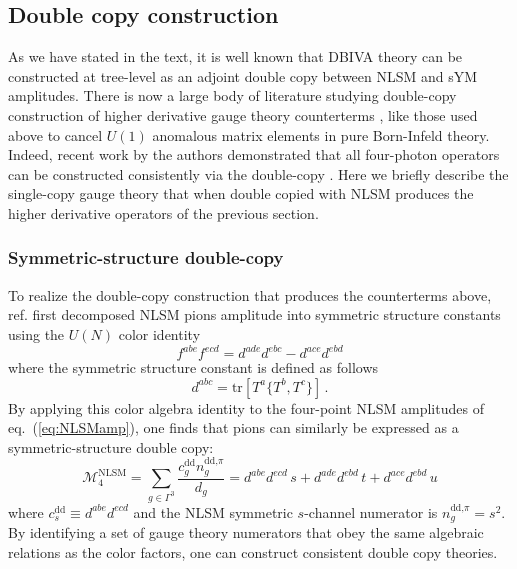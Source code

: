 \documentclass[11pt,letter]{article}
\def\eqn#1{eq.~(\ref{#1})}
\begin{document}
\subsection{Double copy construction}\label{sec:ActionDC}
As we have stated in the text, it is well known that DBIVA theory can be constructed at tree-level as an adjoint double copy between NLSM and sYM amplitudes. There is now a large body of literature studying double-copy construction of higher derivative gauge theory counterterms \cite{Carrasco:2019yyn,Carrasco:2021ptp,Chi:2021mio,Bonnefoy:2021qgu,Carrasco:2022lbm,Carrasco:2022sck,Pavao:2022kog,Chen:2022shl,Chen:2023dcx,Brown:2023srz}, like those used above to cancel $U(1)$ anomalous matrix elements in pure Born-Infeld theory. Indeed, recent work by the authors demonstrated that all four-photon operators can be constructed consistently via the double-copy \cite{Carrasco:2022jxn}. Here we briefly describe the single-copy gauge theory that when double copied with NLSM produces the higher derivative operators of the previous section. 
\subsubsection{Symmetric-structure double-copy}\label{sec:symDC}
To realize the double-copy construction that produces the counterterms above, ref. \cite{Carrasco:2022jxn} first decomposed NLSM pions amplitude into symmetric structure constants using the $U(N)$ color identity
\begin{equation}
f^{abe}f^{ecd} = d^{ade}d^{ebc}- d^{ace}d^{ebd}
\end{equation}
where the symmetric structure constant is defined as follows
\begin{equation}
d^{abc} = \text{tr}[T^a\{T^b,T^c\}]\,.
\end{equation}
By applying this color algebra identity to the four-point NLSM amplitudes of \eqn{eq:NLSMamp}, one finds that pions can similarly be expressed as a {symmetric-structure} double copy:
\begin{equation}
\mathcal{M}^{\text{NLSM}}_4 =  \sum_{g\in \Gamma^3} \frac{c_g^{\text{dd}}n^{\text{dd,}\pi}_g}{d_g}= d^{abe}d^{ecd}\,s+d^{ade}d^{ebd}\,t+d^{ace}d^{ebd}\,u 
\end{equation}
where $c_s^{\text{dd}} \equiv d^{abe}d^{ecd}$ and the NLSM symmetric $s$-channel numerator is $n^{\text{dd,}\pi}_g=s^2$. By identifying a set of gauge theory numerators that obey the same algebraic relations as the color factors, one can construct consistent double copy theories. 
\end{document}
